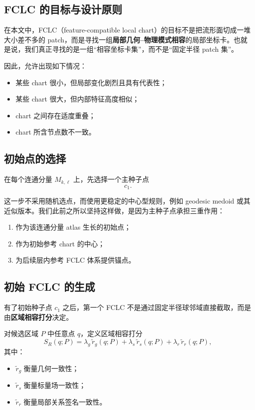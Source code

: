 \documentclass[12pt,a4paper]{ctexart}
\begin{document}
\subsection{FCLC 的目标与设计原则}

在本文中，FCLC（feature-compatible local chart）的目标不是把流形面切成一堆大小差不多的 patch，而是寻找一组\textbf{局部几何--物理模式相容}的局部坐标卡。也就是说，我们真正寻找的是一组“相容坐标卡集”，而不是“固定半径 patch 集”。

因此，允许出现如下情况：
\begin{itemize}[leftmargin=2em]
    \item 某些 chart 很小，但局部变化剧烈且具有代表性；
    \item 某些 chart 很大，但内部特征高度相似；
    \item chart 之间存在适度重叠；
    \item chart 所含节点数不一致。
\end{itemize}

\subsection{初始点的选择}

在每个连通分量 \(M_{k,\ell}\) 上，先选择一个主种子点
\[
c_1.
\]

这一步不采用随机选点，而使用更稳定的中心型规则，例如 geodesic medoid 或其近似版本。我们此前之所以坚持这样做，是因为主种子点承担三重作用：

\begin{enumerate}[leftmargin=2em]
    \item 作为该连通分量 atlas 生长的初始点；
    \item 作为初始参考 chart 的中心；
    \item 为后续层内参考 FCLC 体系提供锚点。
\end{enumerate}

\subsection{初始 FCLC 的生成}

有了初始种子点 \(c_1\) 之后，第一个 FCLC 不是通过固定半径球邻域直接截取，而是由\textbf{区域相容打分}决定。

对候选区域 \(P\) 中任意点 \(q\)，定义区域相容打分
\[
S_R(q;P)
=
\lambda_g\,\tilde r_g(q;P)
+
\lambda_s\,\tilde r_s(q;P)
+
\lambda_r\,\tilde r_r(q;P),
\]
其中：
\begin{itemize}[leftmargin=2em]
    \item \(\tilde r_g\) 衡量几何一致性；
    \item \(\tilde r_s\) 衡量标量场一致性；
    \item \(\tilde r_r\) 衡量局部关系签名一致性。
\end{itemize}
\end{document}

